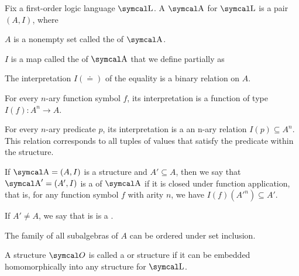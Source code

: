 \begin{definition}\label{def:first_order_structure}\cite[definition 14.27]{OpenLogic20201202}
  Fix a first-order logic language \( \CL \). A  \( \CA \) for \( \CL \) is a pair \( (A, I) \), where
  \begin{defenum}
     \( A \) is a nonempty set called the  of \( \CA \).

     \( I \) is a map called the  of \( \CA \) that we define partially as
    \begin{defenum}
       The interpretation \( I(\doteq) \) of the equality is a binary relation on \( A \).

       For every \( n \)-ary function symbol \( f \), its interpretation is a function of type \( I(f): A^n \to A \).

       For every \( n \)-ary predicate \( p \), its interpretation is a an n-ary relation \( I(p) \subseteq A^n \). This relation corresponds to all tuples of values that satisfy the predicate within the structure.
    \end{defenum}
  \end{defenum}
\end{definition}

\begin{definition}\label{def:first_order_substructure}
  If \( \CA = (A, I) \) is a structure and \( A' \subseteq A \), then we say that \( \CA' = (A', I) \) is a  of \( \CA \) if it is closed under function application, that is, for any function symbol \( f \) with arity \( n \), we have \( I(f)(A'^n) \subseteq A' \).

  If \( A' \neq A \), we say that is is a .

  The family of all subalgebras of \( A \) can be ordered under set inclusion.

  A structure \( \Cal{O} \) is called a  or  structure if it can be embedded homomorphically  into any structure for \( \CL \).
\end{definition}

